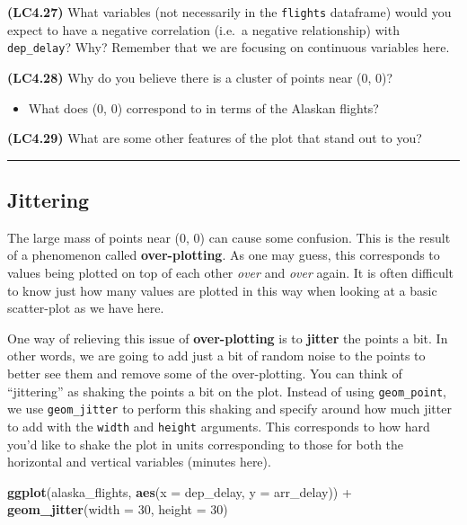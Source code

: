 \documentclass[]{tufte-book}
\newenvironment{Shaded}{\begin{snugshade}}{\end{snugshade}}
\newcommand{\KeywordTok}[1]{\textcolor[rgb]{0.13,0.29,0.53}{\textbf{{#1}}}}
\newcommand{\DataTypeTok}[1]{\textcolor[rgb]{0.13,0.29,0.53}{{#1}}}
\newcommand{\DecValTok}[1]{\textcolor[rgb]{0.00,0.00,0.81}{{#1}}}
\newcommand{\StringTok}[1]{\textcolor[rgb]{0.31,0.60,0.02}{{#1}}}
\newcommand{\NormalTok}[1]{{#1}}
\let\oldrule=\rule
\renewcommand{\rule}[1]{\oldrule{\linewidth}}
\providecommand{\tightlist}{%
  \setlength{\itemsep}{0pt}\setlength{\parskip}{0pt}}
\begin{document}
\textbf{(LC4.27)} What variables (not necessarily in the
\texttt{flights} dataframe) would you expect to have a negative
correlation (i.e.~a negative relationship) with \texttt{dep\_delay}?
Why? Remember that we are focusing on continuous variables here.

\textbf{(LC4.28)} Why do you believe there is a cluster of points near
(0, 0)?

\begin{itemize}
\tightlist
\item
  What does (0, 0) correspond to in terms of the Alaskan flights?
\end{itemize}

\textbf{(LC4.29)} What are some other features of the plot that stand
out to you?

\begin{center}\rule{0.5\linewidth}{\linethickness}\end{center}

\subsection{Jittering}\label{jittering}

The large mass of points near (0, 0) can cause some confusion. This is
the result of a phenomenon called \textbf{over-plotting}. As one may
guess, this corresponds to values being plotted on top of each other
\emph{over} and \emph{over} again. It is often difficult to know just
how many values are plotted in this way when looking at a basic
scatter-plot as we have here.

One way of relieving this issue of \textbf{over-plotting} is to
\textbf{jitter} the points a bit. In other words, we are going to add
just a bit of random noise to the points to better see them and remove
some of the over-plotting. You can think of ``jittering'' as shaking the
points a bit on the plot. Instead of using \texttt{geom\_point}, we use
\texttt{geom\_jitter} to perform this shaking and specify around how
much jitter to add with the \texttt{width} and \texttt{height}
arguments. This corresponds to how hard you'd like to shake the plot in
units corresponding to those for both the horizontal and vertical
variables (minutes here).

\begin{Shaded}
\begin{Highlighting}[]
\KeywordTok{ggplot}\NormalTok{(alaska_flights, }\KeywordTok{aes}\NormalTok{(}\DataTypeTok{x =} \NormalTok{dep_delay, }\DataTypeTok{y =} \NormalTok{arr_delay)) +}\StringTok{ }
\StringTok{  }\KeywordTok{geom_jitter}\NormalTok{(}\DataTypeTok{width =} \DecValTok{30}\NormalTok{, }\DataTypeTok{height =} \DecValTok{30}\NormalTok{)}
\end{Highlighting}
\end{Shaded}
\end{document}
